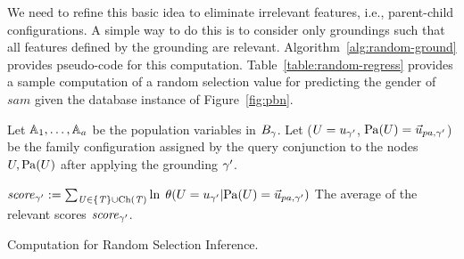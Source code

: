 \documentclass[twoside,11pt]{article}
\begin{document}
We need to refine this basic idea to eliminate irrelevant features, i.e., parent-child configurations. A simple way to do this is to consider only groundings such that all features defined by the grounding are relevant.
Algorithm~\ref{alg:random-ground} provides pseudo-code for this computation. Table~\ref{table:random-regress} provides a sample computation of a random selection value for predicting the gender of $sam$ given the database instance of Figure~\ref{fig:pbn}.


\begin{algorithm}[htbp]

{}
\begin{algorithmic}[1]
\STATE Let $\mathbb{A}_{1},\ldots,\mathbb{A}_{a}$ be the population variables in $B_\gamma$.
\STATE Let ($U = u_{\gamma'}$, $\Pa{\UT} = \GroundPrange{U}$) be the family configuration assigned by the query conjunction to the nodes $U,\mathrm{Pa}(U)$ after applying the grounding $\gamma'$.
\ENDFOR
{}



\STATE $\it{score}_{\gamma'} := \sum_{U \in \{T\} \cup \mathrm{Ch}(T)} \ln$ $\cprob{\UT = \UV_{\grounding'}}{\Pa{\UT} = \GroundPrange{U}}$
\ENDIF
\ENDFOR
\STATE \Return The average of the relevant scores $\it{score}_{\gamma'}$.
\end{algorithmic}
\caption{Computation for Random Selection Inference.}
\label{alg:random-ground}
\end{algorithm}
\end{document}
